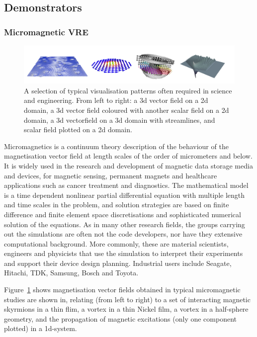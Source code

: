 \subsection{Demonstrators}
\subsubsection{Micromagnetic VRE}
\label{sec:introduction-micromagnetic-vre-demonstrator}

\begin{figure}
\includegraphics[width=1.0\textwidth]{Pictures/micromagnetic-and-3d-vis-4x1.pdf}
\caption{\label{fig:3d-plots} A selection of typical visualisation patterns often required in science and engineering. From left to right: a 3d vector field on a 2d domain, a 3d vector field coloured with another scalar field on a 2d domain, a 3d vectorfield on a 3d domain with streamlines, and scalar field plotted on a 2d domain.}
\end{figure}


Micromagnetics is a continuum theory description of the behaviour of
the magnetisation vector field at length scales of the order of
micrometers and below. It is widely used in the research and
development of magnetic data storage media and devices, for magnetic
sensing, permanent magnets and healthcare applications such as cancer
treatment and diagnostics. The mathematical model is a time dependent
nonlinear partial differential equation with multiple length and time
scales in the problem, and solution strategies are based on finite
difference and finite element space discretisations and sophisticated
numerical solution of the equations. As in many other research fields,
the groups carrying out the simulations are often not the code
developers, nor have they extensive computational background. More
commonly, these are material scientists, engineers and physicists that
use the simulation to interpret their experiments and support their
device design planning. Industrial users include Seagate, Hitachi,
TDK, Samsung, Bosch and Toyota.



Figure~\ref{fig:3d-plots} shows magnetisation vector fields obtained
in typical micromagnetic studies are shown in, relating (from left to
right) to a set of interacting magnetic skyrmions in a thin flim, a
vortex in a thin Nickel film, a vortex in a half-sphere geometry, and
the propagation of magnetic excitations (only one component plotted)
in a 1d-system.

